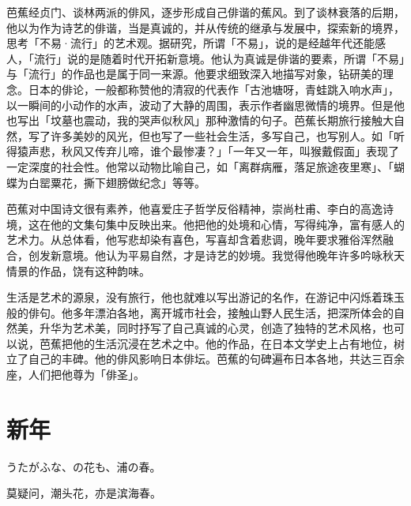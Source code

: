 {    芭蕉经贞门\footnotemark[1]、谈林\footnotemark[2] 两派的俳风，逐步形成自己俳谐的蕉风。到了谈林衰落的后期，他以为作为诗艺的俳谐，当是真诚的，并从传统的继承与发展中，探索新的境界，思考「不易·流行」的艺术观。据研究，所谓「不易」，说的是经越年代还能感人，「流行」说的是随着时代开拓新意境。他认为真诚是俳谐的要素，所谓「不易」与「流行」的作品也是属于同一来源。他要求细致深入地描写对象，钻研美的理念。日本的俳论，一般都称赞他的清寂的代表作「古池塘呀，青蛙跳入响水声」，以一瞬间的小动作的水声，波动了大静的周围，表示作者幽思微情的境界。但是他也写出「坟墓也震动，我的哭声似秋风」那种激情的句子。芭蕉长期旅行接触大自然，写了许多美妙的风光，但也写了一些社会生活，多写自己，也写别人。如「听得猿声悲，秋风又传弃儿啼，谁个最惨凄？」「一年又一年，叫猴戴假面」表现了一定深度的社会性。他常以动物比喻自己，如「离群病雁，落足旅途夜里寒」、「蝴蝶为白罂粟花，撕下翅膀做纪念」等等。

    芭蕉对中国诗文很有素养，他喜爱庄子哲学反俗精神，崇尚杜甫、李白的高逸诗境，这在他的文集句集中反映出来。他把他的处境和心情，写得纯净，富有感人的艺术力。从总体看，他写悲却染有喜色，写喜却含着悲调，晚年要求雅俗浑然融合，创发新意境。他认为平易自然，才是诗艺的妙境。我觉得他晚年许多吟咏秋天情景的作品，饶有这种韵味。

    生活是艺术的源泉，没有旅行，他也就难以写出游记的名作，在游记中闪烁着珠玉般的俳句。他多年漂泊各地，离开城市社会，接触山野人民生活，把深所体会的自然美，升华为艺术美，同时抒写了自己真诚的心灵，创造了独特的艺术风格，也可以说，芭蕉把他的生活沉浸在艺术之中。他的作品，在日本文学史上占有地位，树立了自己的丰碑。他的俳风影响日本俳坛。芭蕉的句碑遍布日本各地，共达三百余座，人们把他尊为「俳圣」。


}

\newpage

\section{\FK 新年}

\setcounter{haikucounter}{0}

\begin{haiku}
    {\FH うたがふな、の花も、浦の春。}

    {\FK 莫疑问，潮头花，亦是滨海春。}
\end{haiku}

